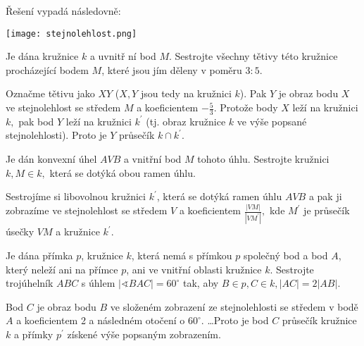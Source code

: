 \begin{reseni}
Řešení vypadá následovně:
\begin{center}
 \texttt{[image: stejnolehlost.png]}
\end{center}
\end{reseni}

\begin{priklad}
Je dána kružnice $k$ a uvnitř ní bod $M$. Sestrojte všechny tětivy této kružnice
procházející bodem $M$, které jsou jím děleny v poměru $3:5.$
\end{priklad}

\begin{reseni}
Označme tětivu jako $XY$ ($X,Y$ jsou tedy na kružnici $k$). Pak $Y$ je obraz
bodu $X$ ve stejnolehlost se středem $M$ a koeficientem $-\frac{5}{3}$. Protože
body $X$ leží na kružnici $k,$ pak bod $Y$ leží na kružnici $k^\prime$ (tj. obraz
kružnice $k$ ve výše popsané stejnolehlosti). Proto je $Y$ průsečík $k\cap k^\prime$.
\end{reseni}

\begin{priklad}
Je dán konvexní úhel $AVB$ a vnitřní bod $M$ tohoto úhlu. Sestrojte kružnici $k,M\in k,$
která se dotýká obou ramen úhlu.
\end{priklad}

\begin{reseni}
Sestrojíme si libovolnou kružnici $k^\prime$, která se dotýká ramen úhlu $AVB$ a pak
ji zobrazíme ve stejnolehlost se středem $V$ a koeficientem $\frac{|VM|}{|VM^\prime|},$
kde $M^\prime$ je průsečík úsečky $VM$ a kružnice $k^\prime$.
\end{reseni}

\begin{priklad}
Je dána přímka $p$, kružnice $k$, která nemá s přímkou $p$ společný bod a bod $A$, který
neleží ani na přímce $p$, ani ve vnitřní oblasti kružnice $k$. Sestrojte trojúhelník
$ABC$ s úhlem $|\sphericalangle BAC|=60^\circ$ tak, aby $B\in p, C \in k, |AC|=2|AB|.$
\end{priklad}

\begin{reseni}
Bod $C$ je obraz bodu $B$ ve složeném zobrazení ze stejnolehlosti se středem v bodě
$A$ a koeficientem 2 a následném otočení o $60^\circ.$ \dots Proto je bod $C$ průsečík
kružnice $k$ a přímky $p^\prime$ získené výše popsaným zobrazením.
\end{reseni}

